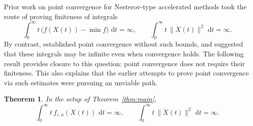 \documentclass{article}
\newtheorem{theorem}{Theorem}[section]
\theoremstyle{remark}
\newcommand{\R}{\mathbb{R}}
\newcommand{\norm}[1]{\| #1\|}
\newcommand{\dd}{\,\mathrm{d}}
\begin{document}
Prior work on point convergence for Nesterov-type accelerated methods took the route of proving finiteness of integrals
\[
  \int_0^\infty t\,\big( f(X(t))-\min f\big)\,\dd t=\infty,
  \qquad
  \int_0^\infty t\,\norm{\dot X(t)}^2\,\dd t=\infty.
\]
By contrast, \cite{JangRyu2025,BotFadiliNguyen2025} established point convergence without such bounds, and suggested that these integrals may be infinite even when convergence holds. The following result provides closure to this question: point convergence does not require their finiteness. This also explains that the earlier attempts to prove point convergence via such estimates were pursuing an unviable path.


\begin{theorem}\label{thm:weighted-divergence}
In the setup of Theorem~\ref{thm:main}, 
\[
  \int_0^\infty t\,f_{\varepsilon,a}(X(t))\,\dd t=\infty,
  \qquad
  \int_0^\infty t\,\norm{\dot X(t)}^2\,\dd t=\infty.
\]
\end{theorem}






\end{document}
